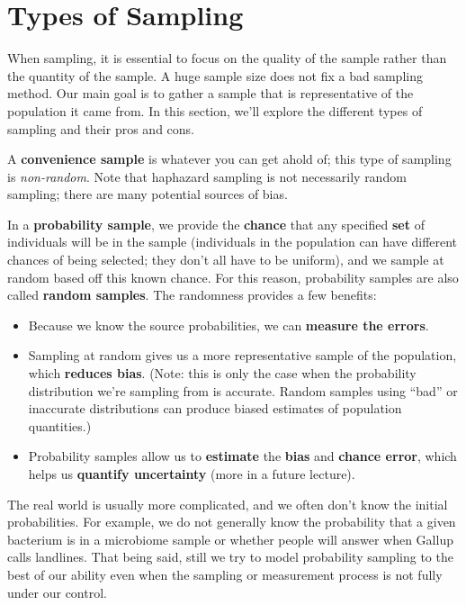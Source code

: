 \documentclass[
  letterpaper,
  DIV=11,
  numbers=noendperiod]{scrreprt}
\providecommand{\tightlist}{%
  \setlength{\itemsep}{0pt}\setlength{\parskip}{0pt}}\usepackage{longtable,booktabs,array}
\begin{document}
\section{Types of Sampling}\label{types-of-sampling}

When sampling, it is essential to focus on the quality of the sample
rather than the quantity of the sample. A huge sample size does not fix
a bad sampling method. Our main goal is to gather a sample that is
representative of the population it came from. In this section, we'll
explore the different types of sampling and their pros and cons.

A \textbf{convenience sample} is whatever you can get ahold of; this
type of sampling is \emph{non-random}. Note that haphazard sampling is
not necessarily random sampling; there are many potential sources of
bias.

In a \textbf{probability sample}, we provide the \textbf{chance} that
any specified \textbf{set} of individuals will be in the sample
(individuals in the population can have different chances of being
selected; they don't all have to be uniform), and we sample at random
based off this known chance. For this reason, probability samples are
also called \textbf{random samples}. The randomness provides a few
benefits:

\begin{itemize}
\tightlist
\item
  Because we know the source probabilities, we can \textbf{measure the
  errors}.
\item
  Sampling at random gives us a more representative sample of the
  population, which \textbf{reduces bias}. (Note: this is only the case
  when the probability distribution we're sampling from is accurate.
  Random samples using ``bad'' or inaccurate distributions can produce
  biased estimates of population quantities.)
\item
  Probability samples allow us to \textbf{estimate} the \textbf{bias}
  and \textbf{chance error}, which helps us \textbf{quantify
  uncertainty} (more in a future lecture).
\end{itemize}

The real world is usually more complicated, and we often don't know the
initial probabilities. For example, we do not generally know the
probability that a given bacterium is in a microbiome sample or whether
people will answer when Gallup calls landlines. That being said, still
we try to model probability sampling to the best of our ability even
when the sampling or measurement process is not fully under our control.
\end{document}
